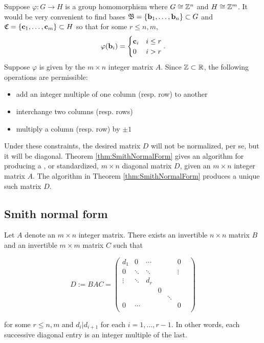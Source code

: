 \documentclass[../algebraNotesMSRI-UP2016.tex]{subfiles}
\begin{document}
\begin{frame}
Suppose $\varphi: G\to H$ is a group homomorphism where $G\cong \mathbb Z^n$ and $H\cong \mathbb Z^m$.  It would be very convenient to find bases $\mathfrak B=\{\mathbf b_1,\dots,\mathbf b_n\}\subset G$ and $\mathfrak C=\{\mathbf c_1,\dots,\mathbf c_m\}\subset H$ so that for some $r\leq n,m$,
\[
\varphi(\mathbf b_i)
	=\begin{cases}
		\mathbf c_i & i\leq r \\
		0 & i>r
	\end{cases}.
\]
Suppose $\varphi$ is given by the $m\times n$ integer matrix $A$.  Since $\mathbb Z\subset\mathbb R$, the following operations are permissible:
\begin{itemize}
\item add an integer multiple of one column (resp. row) to another
\item interchange two columns (resp. rows)
\item multiply a column (resp. row) by $\pm 1$
\end{itemize}  
\end{frame}

\begin{frame}[c]
Under these constraints, the desired matrix $D$ will not be normalized, per se, but it will be diagonal.  Theorem \ref{thm:SmithNormalForm} gives an algorithm for producing a , or standardized,
$m\times n$ diagonal matrix $D$, given an $m\times n$ integer matrix $A$.  The algorithm in Theorem \ref{thm:SmithNormalForm} produces a unique such matrix $D$.  
\end{frame}

\subsection[\subsecname]{Smith normal form}
\begin{frame}{\subsecname}
\begin{thm}\label{thm:SmithNormalForm}
Let $A$ denote an $m\times n$ integer matrix.  There exists an invertible $n\times n$ matrix $B$ and an invertible $m\times m$ matrix $C$ such that 

\[
D:=BAC=\begin{pmatrix}
	d_1 & 0 & \cdots & & & 0 \\
	0 & \ddots & \ddots & & & \vdots \\
	\vdots & \ddots & d_r & & & \\
	 & & & 0 & & & \\
	 & & & & \ddots &  \\
	0 & \cdots & & & & 0 \\	
	\end{pmatrix}
\]

for some $r\leq n,m$ and $d_i|d_{i+1}$ for each $i=1,\dots,r-1$.  In other words, each successive diagonal entry is an integer multiple of the last. 
\end{thm}  
\end{frame}
\end{document}
